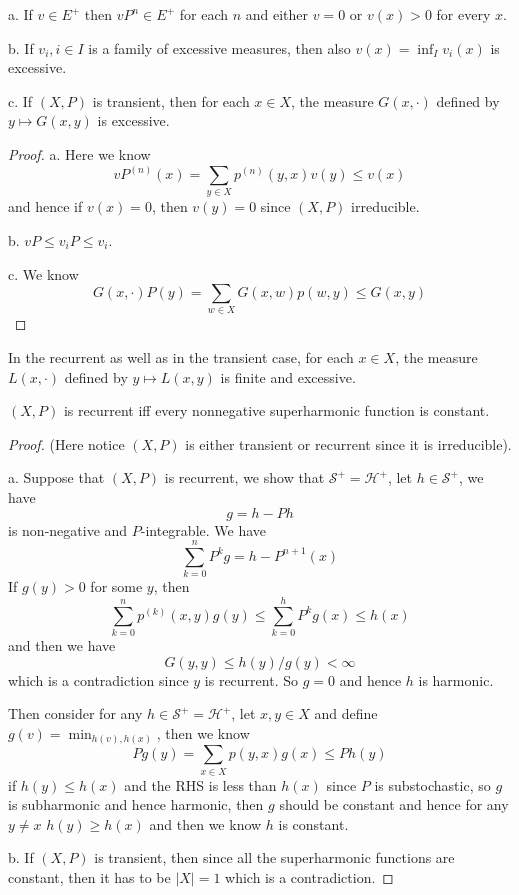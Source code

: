 \documentclass[lang=en,11pt,a4paper,citestyle =authoryear]{elegantpaper}
\newcommand{\Har}{\mathcal{H}}
\newcommand{\Sar}{\mathcal{S}}
\begin{document}
\begin{lemma}
    a. If $v\in E^+$ then $vP^n\in E^+$ for each $n$ and either $v = 0$ or $v(x) > 0$ for every $x$.\par
    b. If $v_i, i\in I$ is a family of excessive measures, then also $v(x) = \inf_I v_i(x)$ is excessive.\par
    c. If $(X,P)$ is transient, then for each $x\in X$, the measure $G(x,\cdot)$ defined by $y\mapsto G(x,y)$ is excessive.
\end{lemma}
\begin{proof}
    a. Here we know
    \[
    vP^{(n)}(x) = \sum\limits_{y\in X}p^{(n)}(y,x)v(y) \leq v(x)
    \]
    and hence if $v(x) = 0$, then $v(y) = 0$ since $(X,P)$ irreducible.\par
    b. $vP \leq v_i P \leq v_i$.\par
    c. We know
    \[
    G(x,\cdot)P(y) = \sum\limits_{w\in X} G(x,w)p(w,y) \leq G(x,y)
    \]
\end{proof}

\begin{lemma}
    In the recurrent as well as in the transient case, for each $x\in X$, the measure $L(x,\cdot)$ defined by $y\mapsto L(x,y)$ is finite and excessive.
\end{lemma}

\begin{theorem}
    $(X,P)$ is recurrent iff every nonnegative superharmonic function is constant.
\end{theorem}
\begin{proof}
    (Here notice $(X,P)$ is either transient or recurrent since it is irreducible).\par
    a. Suppose that $(X,P)$ is recurrent, we show that $\Sar^+ = \Har^+$, let $h\in \Sar ^+$, we have
    \[g = h - Ph\]
    is non-negative and $P$-integrable. We have
    \[
    \sum_{k=0}^n P^kg = h-P^{n+1}(x)
    \]
    If $g(y) > 0$ for some $y$, then
    \[
    \sum\limits_{k=0}^{n}p^{(k)}(x,y)g(y) \leq \sum_{k=0}^h P^kg(x) \leq h(x)
    \]
    and then we have
    \[
    G(y,y) \leq h(y)/g(y) < \infty
    \]
    which is a contradiction since $y$ is recurrent. So $g = 0$ and hence $h$ is harmonic.\par
    Then consider for any $h\in \Sar^+ = \Har^+$, let $x,y\in X$ and define $g(v) = \min_{h(v),h(x)}$, then we know
    \[
    Pg(y) = \sum\limits_{x\in X}p(y,x) g(x) \leq Ph(y) 
    \]
    if $h(y) \leq h(x)$ and the RHS is less than $h(x)$ since $P$ is substochastic, so $g$ is subharmonic and hence harmonic, then $g$ should be constant and hence for any $y\neq x$ $h(y) \geq h(x)$ and then we know $h$ is constant.\par
    b. If $(X,P)$ is transient, then since all the superharmonic functions are constant, then it has to be $|X| = 1$ which is a contradiction.
\end{proof}
\end{document}
